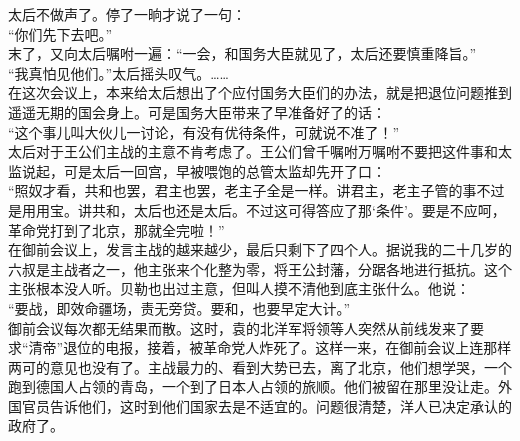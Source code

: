 太后不做声了。停了一晌才说了一句：\\

“你们先下去吧。”\\

末了，又向太后嘱咐一遍：“一会，和国务大臣就见了，太后还要慎重降旨。”\\

“我真怕见他们。”太后摇头叹气。……\\

在这次会议上，本来给太后想出了个应付国务大臣们的办法，就是把退位问题推到遥遥无期的国会身上。可是国务大臣带来了早准备好了的话：\\

“这个事儿叫大伙儿一讨论，有没有优待条件，可就说不准了！”\\

太后对于王公们主战的主意不肯考虑了。王公们曾千嘱咐万嘱咐不要把这件事和太监说起，可是太后一回宫，早被喂饱的总管太监却先开了口：\\

“照奴才看，共和也罢，君主也罢，老主子全是一样。讲君主，老主子管的事不过是用用宝。讲共和，太后也还是太后。不过这可得答应了那‘条件’。要是不应呵，革命党打到了北京，那就全完啦！”\\

在御前会议上，发言主战的越来越少，最后只剩下了四个人。据说我的二十几岁的六叔是主战者之一，他主张来个化整为零，将王公封藩，分踞各地进行抵抗。这个主张根本没人听。贝勒也出过主意，但叫人摸不清他到底主张什么。他说：\\

“要战，即效命疆场，责无旁贷。要和，也要早定大计。”\\

御前会议每次都无结果而散。这时，袁的北洋军将领等人突然从前线发来了要求“清帝”退位的电报，接着，被革命党人炸死了。这样一来，在御前会议上连那样两可的意见也没有了。主战最力的、看到大势已去，离了北京，他们想学哭，一个跑到德国人占领的青岛，一个到了日本人占领的旅顺。他们被留在那里没让走。外国官员告诉他们，这时到他们国家去是不适宜的。问题很清楚，洋人已决定承认的政府了。\\

